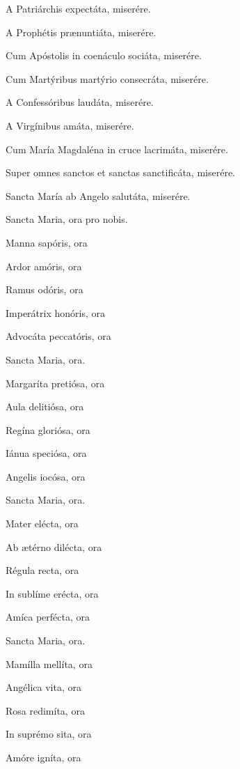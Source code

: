 \documentclass[12pt,a6paper]{book}
\begin{document}
\begin{sloppy}
A Patriárchis expectáta, miserére.

A Prophétis prænuntiáta, miserére.

Cum Apóstolis in coenáculo sociáta, miserére.

Cum Martýribus martýrio consecráta, miserére.

A Confessóribus laudáta, miserére.

A Virgínibus amáta, miserére.

Cum María Magdaléna in cruce lacrimáta, miserére.

Super omnes sanctos et sanctas sanctificáta, miserére.

Sancta María ab Angelo salutáta, miserére.

Sancta Maria, ora pro nobis.

\vspace{3mm}

Manna sapóris, ora

Ardor amóris, ora

Ramus odóris, ora

Imperátrix honóris, ora

Advocáta peccatóris, ora

Sancta Maria, ora.

\vspace{3mm}


Margaríta pretiósa, ora

Aula delitiósa, ora

Regína gloriósa, ora

Iánua speciósa, ora

Angelis iocósa, ora

Sancta Maria, ora.

\vspace{3mm}

Mater elécta, ora

Ab ætérno dilécta, ora

Régula recta, ora

In sublíme erécta, ora

Amíca perfécta, ora

Sancta Maria, ora.

\vspace{3mm}

Mamílla mellíta, ora

Angélica vita, ora

Rosa redimíta, ora

In suprémo sita, ora

Amóre igníta, ora


\end{sloppy}
\end{document}
